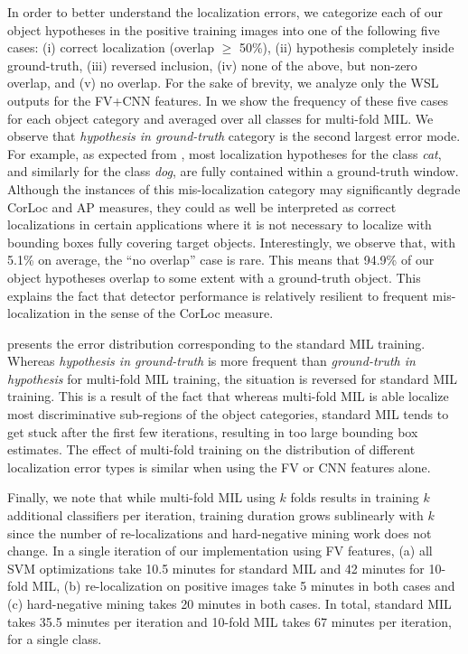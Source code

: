 \documentclass[10pt,journal,cspaper,final,twocolumn,compsoc]{./IEEEtran}
\begin{document}
In order to better understand the localization errors, we
categorize each of our object hypotheses in the positive
training images into one of the following five cases: (i)
correct localization (overlap $\geq$ 50\%), (ii)
hypothesis completely inside ground-truth, (iii) reversed
inclusion, (iv) none of the above, but non-zero overlap,
and (v) no overlap. For the sake of brevity, we analyze
only the WSL outputs for the FV+CNN features. In
 we show the frequency of
these five cases for each object category and averaged
over all classes for multi-fold MIL.  We observe that {\em hypothesis in
ground-truth} category is the second largest error mode.
For example, as expected from , most
localization hypotheses for the class \emph{cat}, and
similarly for the class \emph{dog}, are fully contained
within a ground-truth window. Although the instances of
this mis-localization category may significantly degrade
CorLoc and AP measures, they could as well be interpreted
as correct localizations in certain applications where it
is not necessary to localize with bounding boxes fully
covering target objects. Interestingly, we observe that,
with 5.1\% on average, the ``no overlap'' case is rare.
This means that 94.9\% of our object hypotheses overlap to
some extent with a ground-truth object.  This explains the
fact that detector performance is relatively resilient to
frequent mis-localization in the sense of the CorLoc
measure.

 presents the error
distribution corresponding to the standard MIL training.
Whereas {\em hypothesis in ground-truth} is more
frequent than {\em ground-truth in hypothesis} for
multi-fold MIL training, the situation is reversed for
standard MIL training.  This is a result of the fact that
whereas multi-fold MIL is able localize most
discriminative sub-regions of the object categories,
standard MIL tends to get stuck after the first few
iterations, resulting in too large bounding box estimates.
The effect of multi-fold training on the distribution of
different localization error types is similar when using the FV or CNN
features alone.

Finally, we note that while multi-fold MIL using $k$ folds
results in training $k$ additional classifiers per
iteration, training duration grows sublinearly with $k$
since the number of re-localizations and hard-negative
mining work does not change. In a single iteration of our
implementation using FV features, (a) all SVM
optimizations take 10.5 minutes for standard MIL and 42
minutes for 10-fold MIL, (b) re-localization on positive
images take 5 minutes in both cases and (c) hard-negative
mining takes 20 minutes in both cases. In total, standard
MIL takes 35.5 minutes per iteration and 10-fold MIL takes
67 minutes per iteration, for a single class.
\end{document}
